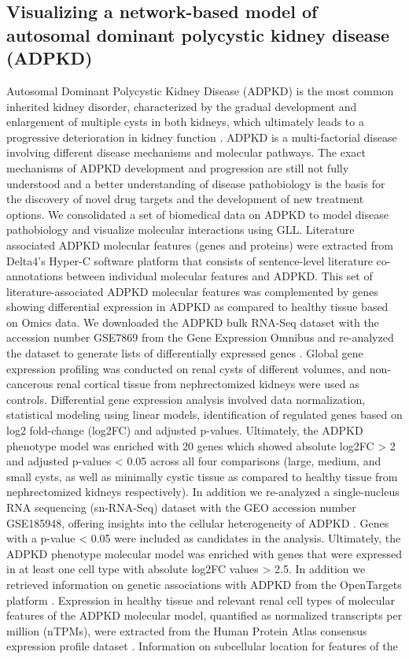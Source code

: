 \subsection{Visualizing a network-based model of autosomal dominant polycystic kidney disease (ADPKD)}
Autosomal Dominant Polycystic Kidney Disease (ADPKD) is the most common inherited kidney disorder, characterized by the gradual development and enlargement of multiple cysts in both kidneys, which ultimately leads to a progressive deterioration in kidney function \citep{formicaMolecularPathwaysInvolved2020}. ADPKD is a multi-factorial disease involving different disease mechanisms and molecular pathways. The exact mechanisms of ADPKD development and progression are still not fully understood and a better understanding of disease pathobiology is the basis for the discovery of novel drug targets and the development of new treatment options. We consolidated a set of biomedical data on ADPKD to model disease pathobiology and visualize molecular interactions using GLL. Literature associated ADPKD molecular features (genes and proteins) were extracted from Delta4's Hyper-C software platform that consists of sentence-level literature co-annotations between individual molecular features and ADPKD. This set of literature-associated ADPKD molecular features was complemented by genes showing differential expression in ADPKD as compared to healthy tissue based on Omics data. We downloaded the ADPKD bulk RNA-Seq dataset with the accession number GSE7869 from the Gene Expression Omnibus and re-analyzed the dataset to generate lists of differentially expressed genes \citep{songSystemsBiologyAutosomal2009}. Global gene expression profiling was conducted on renal cysts of different volumes, and non-cancerous renal cortical tissue from nephrectomized kidneys were used as controls. Differential gene expression analysis involved data normalization, statistical modeling using linear models, identification of regulated genes based on log2 fold-change (log2FC) and adjusted p-values. Ultimately, the ADPKD phenotype model was enriched with 20 genes which showed absolute log2FC > 2 and adjusted p-values < 0.05 across all four comparisons (large, medium, and small cysts, as well as minimally cystic tissue as compared to healthy tissue from nephrectomized kidneys respectively). In addition we re-analyzed a single-nucleus RNA sequencing (sn-RNA-Seq) dataset with the GEO accession number GSE185948, offering insights into the cellular heterogeneity of ADPKD \citep{mutoDefiningCellularComplexity2022}. Genes with a p-value < 0.05 were included as candidates in the analysis. Ultimately, the ADPKD phenotype molecular model was enriched with genes that were expressed in at least one cell type with absolute log2FC values > 2.5. In addition we retrieved information on genetic associations with ADPKD from the OpenTargets platform \citep{bunielloOpenTargetsPlatform2025}. Expression in healthy tissue and relevant renal cell types of molecular features of the ADPKD molecular model, quantified as normalized transcripts per million (nTPMs), were extracted from the Human Protein Atlas consensus expression profile dataset \citep{karlssonSingleCellType2021}. Information on subcellular location for features of the 